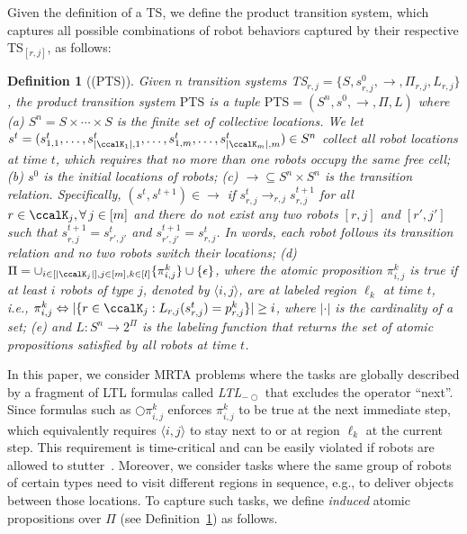 \documentclass[Afour,sageh,times]{sagej}
\newtheorem{defn}[thm]{Definition}
\newcommand{\ltl}{ {\it LTL}$_{-\bigcirc}$ }
\newcommand{\ag}[2]{\langle#1,#2\rangle}
\renewcommand{\ap}[3]{\mathcal{\pi}_{{#1},{#2}}^{#3}}
\begin{document}
Given the definition of a TS, we define the {product transition system}, which captures all possible combinations of robot behaviors captured by their respective TS$_{[r,j]}$, as follows:
\begin{defn}[(PTS)]\label{def:pts}
  Given $n$ transition systems TS$_{r,j} = \{S, s_{r,j}^0, \to, \Pi_{r,j}, L_{r,j}\}$, the product transition system $\text{PTS}$ is a tuple $\text{PTS} = (S^n, s^0, \to, \Pi, L)$ where (a) $S^n = S\times \cdots \times S$ is the finite set of collective locations. We let $s^t = (s_{1,1}^t, \ldots, s_{|\ccalK_1|,1}^t, \ldots, s_{1,m}^t, \ldots, s_{|\ccalK_m|, m}^t) \in S^n$ collect all robot locations at time $t$, which requires that no more than one robots occupy the same free cell; (b) $s^0$ is the initial locations of robots; (c) $\to \subseteq S^n \times S^n$ is the transition relation. Specifically, $(s^t, s^{t+1}) \in \to$ if $s^t_{r,j}\rightarrow_{r,j} s^{t+1}_{r,j}$ for all $r\in \ccalK_j, \forall \,j \in [m]$ and there do not exist any two robots $[r,j]$ and $[r',j']$ such that $s^{t+1}_{r,j} = s^{t}_{r',j'}$ and $s^{t+1}_{r',j'} = s^{t}_{r,j}$. In words, each robot follows its transition relation and no two robots switch their locations; (d) $\Pi = \cup_{i\in[|\ccalK_j|], j\in [m], k\in [l]}\{\pi_{i,j}^k\} \cup \{\epsilon\}$, where the atomic proposition $\ap{i}{j}{k}$ is true if at least $i$ robots of type $j$, denoted by $\ag{i}{j}$, are at labeled region $\ell_k$ at time $t$, i.e., $\ap{i}{j}{k} \Leftrightarrow |\{r\in \ccalK_j: L_{r,j}(s_{r,j}^t) = p_{r,j}^k \}| \geq i$, where $|\cdot|$ is the cardinality of a set; (e) and $L: S^n \to 2^{\Pi}$ is the labeling function that returns the set of atomic propositions satisfied by all robots at time $t$.
\end{defn}

In this paper, we consider MRTA problems where the tasks are globally described by  a fragment of LTL formulas called \ltl that excludes the operator ``next''. Since formulas such as  $\bigcirc \ap{i}{j}{k}$ enforces $\ap{i}{j}{k}$ to be true at the next immediate step, which equivalently requires $\langle i,j \rangle$ to stay next to or at region $\ell_k$ at the current step. This requirement  is time-critical and can be easily violated if robots are allowed to stutter~\cite{sahin2019multirobot}. Moreover, we consider tasks where the same group of robots of certain types  need to visit different regions in sequence, e.g., to deliver objects between those locations. To capture such tasks, we  define {\it induced} atomic propositions over $\Pi$ (see Definition~\ref{def:pts})  as follows.
\end{document}
